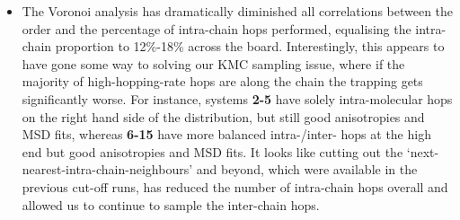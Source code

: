 \documentclass[12pt]{article}
\begin{document}
\begin{itemize}
{Why is this? I feel like the fineGraining shouldn't affect the efficacy of Voronoi neighbourlist calculation - at the end of the day we only care about the COM centres of the chromophores.
}
\item{The Voronoi analysis has dramatically diminished all correlations between the order and the percentage of intra-chain hops performed, equalising the intra-chain proportion to 12\%-18\% across the board.
        Interestingly, this appears to have gone some way to solving our KMC sampling issue, where if the majority of high-hopping-rate hops are along the chain the trapping gets significantly worse.
        For instance, systems \textbf{2-5} have solely intra-molecular hops on the right hand side of the distribution, but still good anisotropies and MSD fits, whereas \textbf{6-15} have more balanced intra-/inter- hops at the high end but good anisotropies and MSD fits.
        It looks like cutting out the `next-nearest-intra-chain-neighbours' and beyond, which were available in the previous cut-off runs, has reduced the number of intra-chain hops overall and allowed us to continue to sample the inter-chain hops.
    }
\end{itemize}
\end{document}
